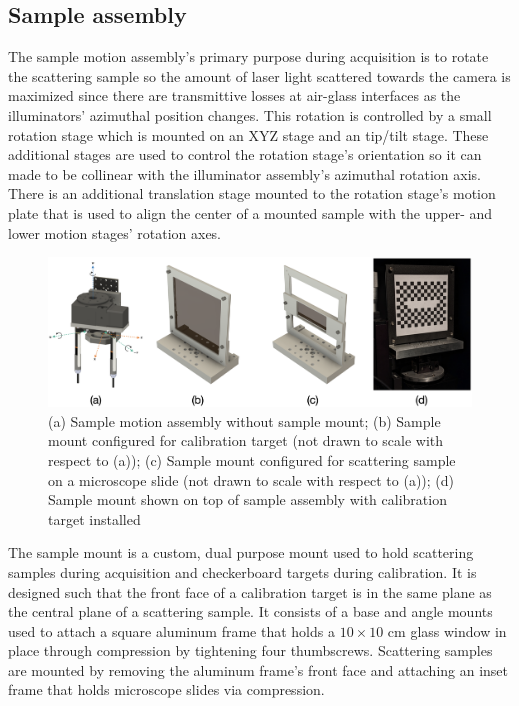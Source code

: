 \subsection{Sample assembly}
The sample motion assembly's primary purpose during acquisition is to rotate the scattering sample so the amount of laser light scattered towards the camera is maximized since there are transmittive losses at air-glass interfaces as the illuminators' azimuthal position changes. This rotation is controlled by a small rotation stage which is mounted on an XYZ stage and an tip/tilt stage. These additional stages are used to control the rotation stage's orientation so it can made to be collinear with the illuminator assembly's azimuthal rotation axis. There is an additional translation stage mounted to the rotation stage's motion plate that is used to align the center of a mounted sample with the upper- and lower motion stages' rotation axes.
\begin{figure}
    \centering
    \includegraphics[width=\linewidth]{../figures/sample_assembly_summary.png}
    \caption{(a) Sample motion assembly without sample mount; (b) Sample mount configured for calibration target (not drawn to scale with respect to (a)); (c) Sample mount configured for scattering sample on a microscope slide (not drawn to scale with respect to (a)); (d) Sample mount shown on top of sample assembly with calibration target installed}
    \label{fig:sample_motion_assy}
\end{figure}

The sample mount is a custom, dual purpose mount used to hold scattering samples during acquisition and checkerboard targets during calibration. It is designed such that the front face of a calibration target is in the same plane as the central plane of a scattering sample. It consists of a base and angle mounts used to attach a square aluminum frame that holds a $10 \times 10$ cm glass window in place through compression by tightening four thumbscrews. Scattering samples are mounted by removing the aluminum frame's front face and attaching an inset frame that holds microscope slides via compression.

